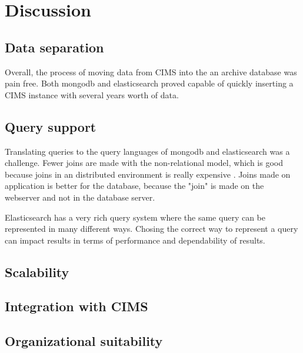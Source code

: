 \chapter{Discussion}
\label{chap:discussion}

\section{Data separation}
Overall, the process of moving data from CIMS into the an archive database was pain free. Both mongodb and elasticsearch proved capable of quickly inserting a CIMS instance with several years worth of data. 

\section{Query support}
Translating queries to the query languages of mongodb and elasticsearch was a challenge.
Fewer joins are made with the non-relational model, which is good because joins in an distributed environment is really expensive \cite{Catell}. Joins made on application is better for the database, because the "join" is made on the webserver and not in the database server.

Elasticsearch has a very rich query system where the same query can be represented in many different ways. Chosing the correct way to represent a query can impact results in terms of performance and dependability of results. 

\section{Scalability}

\section{Integration with CIMS}

\section{Organizational suitability}